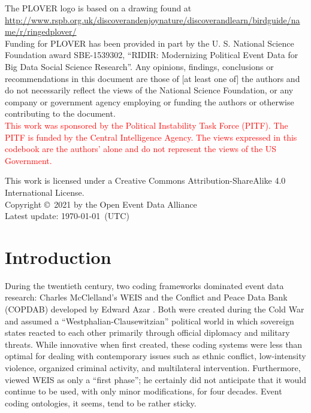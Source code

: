 \documentclass[11pt]{report}
\newcommand{\andy}[1]{\textcolor{red}{#1}}
\begin{document}
\noindent The PLOVER logo is based on a drawing found at\\ \url{http://www.rspb.org.uk/discoverandenjoynature/discoverandlearn/birdguide/name/r/ringedplover/}\\

\noindent Funding for PLOVER has been provided in part by the U. S. National Science Foundation award SBE-1539302, ``RIDIR: Modernizing Political Event Data for Big Data Social Science Research''. Any opinions, findings, conclusions or recommendations in this document are those of [at least one of] the authors and do not necessarily reflect the views of the National Science Foundation, or any company or government agency employing or funding the authors or otherwise contributing to the document.\\

\noindent \andy{This work was sponsored by
the Political Instability Task Force (PITF). The PITF is
funded by the Central Intelligence Agency. The views
expressed in this codebook are the authors' alone and do not
represent the views of the US Government.}


\noindent This work is licensed under a Creative Commons Attribution-ShareAlike 4.0 International License.\\

\noindent  Copyright \copyright ~2021 by the Open Event Data Alliance \\

\noindent Latest update: \today~(UTC)


\chapter{Introduction}

During the twentieth century, two coding frameworks dominated event data research: Charles McClelland's WEIS \citep{McClelland67,McClelland76}  and the Conflict and Peace Data Bank (COPDAB) developed by Edward Azar \citep{AzarSloan75, Azar80, Azar82}. Both were created during the Cold War and assumed a ``Westphalian-Clausewitzian'' political world in which sovereign states reacted to each other primarily through official diplomacy
and military threats. While innovative when first created, these coding systems were less than optimal for dealing with contemporary issues such as ethnic conflict, low-intensity violence, organized criminal activity, and multilateral intervention. Furthermore, \citet[pg. 177]{McClelland83} viewed WEIS as only a ``first phase''; he certainly did not anticipate that it would continue to be used, with only minor modifications, for four decades. Event coding ontologies, it seems, tend to be rather sticky.
\end{document}
